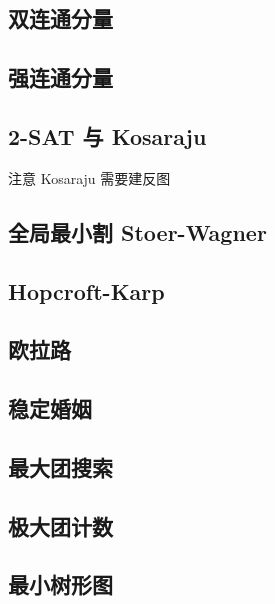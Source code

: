 \documentclass[landscape, twocolumn, 8pt, a4paper, twoside]{extarticle}
\begin{document}
\subsection{双连通分量}


\subsection{强连通分量}


\subsection{2-SAT 与 Kosaraju}
注意 Kosaraju 需要建反图


\subsection{全局最小割 Stoer-Wagner}


\subsection{Hopcroft-Karp}


\subsection{欧拉路}


\subsection{稳定婚姻}


\subsection{最大团搜索}


\subsection{极大团计数}


\subsection{最小树形图}

\end{document}
